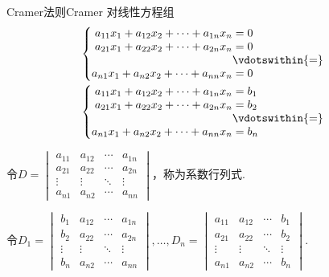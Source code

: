 \begin{theorem}{Cramer法则}{Cramer} 
    对线性方程组
    \begin{gather}
        \label{eq:13:线性方程组1}
        \begin{cases} \begin{aligned}
                a_{11}x_1+a_{12}x_2+\cdots+a_{1n}x_n & = 0             \\
                a_{21}x_1+a_{22}x_2+\cdots+a_{2n}x_n & = 0             \\
                                                     & \vdotswithin{=} \\
                a_{n1}x_1+a_{n2}x_2+\cdots+a_{nn}x_n & = 0
            \end{aligned} \end{cases}
        \\
        \label{eq:13:线性方程组2}
        \begin{cases} \begin{aligned}
                a_{11}x_1+a_{12}x_2+\cdots+a_{1n}x_n & = b_1           \\
                a_{21}x_1+a_{22}x_2+\cdots+a_{2n}x_n & = b_2           \\
                                                     & \vdotswithin{=} \\
                a_{n1}x_1+a_{n2}x_2+\cdots+a_{nn}x_n & = b_n
            \end{aligned} \end{cases}
    \end{gather}

    令$D=\begin{vmatrix}
            a_{11} & a_{12} & \cdots & a_{1n} \\
            a_{21} & a_{22} & \cdots & a_{2n} \\
            \vdots & \vdots & \ddots & \vdots \\
            a_{n1} & a_{n2} & \cdots & a_{nn}
        \end{vmatrix}$，称为系数行列式.

    令$D_1=\begin{vmatrix}
            b_1    & a_{12} & \cdots & a_{1n} \\
            b_2    & a_{22} & \cdots & a_{2n} \\
            \vdots & \vdots & \ddots & \vdots \\
            b_n    & a_{n2} & \cdots & a_{nn}
        \end{vmatrix},\ldots,D_n=\begin{vmatrix}
            a_{11} & a_{12} & \cdots & b_1    \\
            a_{21} & a_{22} & \cdots & b_2    \\
            \vdots & \vdots & \ddots & \vdots \\
            a_{n1} & a_{n2} & \cdots & b_n
        \end{vmatrix}$.


\end{theorem}
